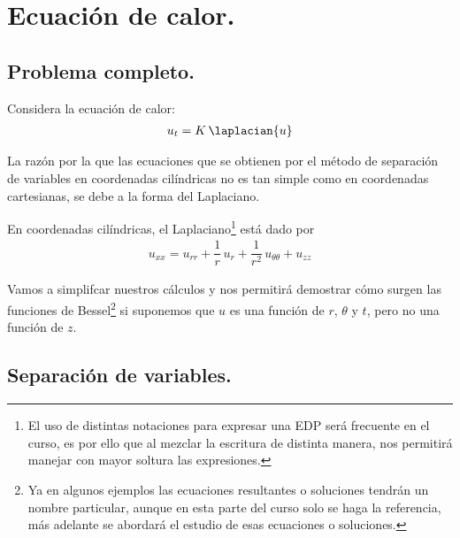 \section{Ecuación de calor.}
\subsection{Problema completo.}

Considera la ecuación de calor:
\begin{align*}
u_{t} =  K \,  \laplacian{u}
\end{align*}

La razón por la que las ecuaciones que se obtienen por el método de separación de variables en coordenadas cilíndricas no es tan simple como en coordenadas cartesianas, se debe a la forma del Laplaciano. 

En coordenadas cilíndricas, el Laplaciano\footnote{El uso de distintas notaciones para expresar una EDP será frecuente en el curso, es por ello que al mezclar la escritura de distinta manera, nos permitirá manejar con mayor soltura las expresiones.} está dado por
\begin{align*}
u_{xx} = u_{rr} + \dfrac{1}{r} \, u_{r} + \dfrac{1}{r^{2}} \, u_{\theta \theta} + u_{zz}
\end{align*}

Vamos a simplifcar nuestros cálculos y nos permitirá demostrar cómo surgen las funciones de Bessel\footnote{Ya en algunos ejemplos las ecuaciones resultantes o soluciones tendrán un nombre particular, aunque en esta parte del curso solo se haga la referencia, más adelante se abordará el estudio de esas ecuaciones o soluciones.} si suponemos que $u$ es una función de $r$, $\theta$ y $t$, pero no una función de $z$.

\subsection{Separación de variables.}

